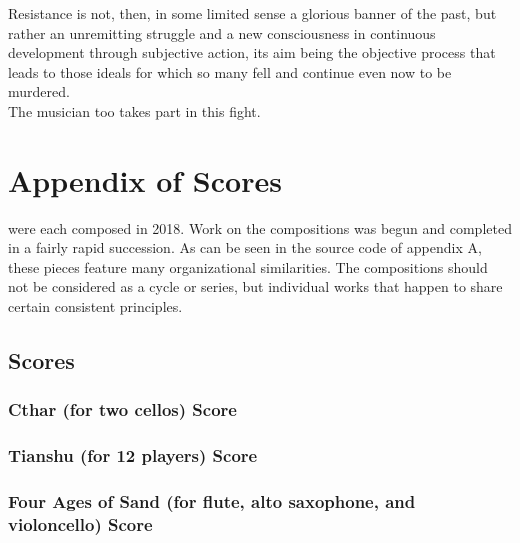 \singlespace
\begin{savequote}[75mm] 
Resistance is not, then, in some limited sense a glorious banner of the past, but rather an unremitting struggle and a new consciousness in continuous development through subjective action, its aim being the objective process that leads to those ideals for which so many fell and continue even now to be murdered. \\
The musician too takes part in this fight. \\
\citeyearpar[Music and Revolution pp.273--274]{Nono}
\end{savequote}

\chapter{Appendix of Scores}
\doublespace
{} were each composed in 2018. Work on the compositions was begun and completed in a fairly rapid succession. As can be seen in the source code of appendix A, these pieces feature many organizational similarities. The compositions should not be considered as a cycle or series, but individual works that happen to share certain consistent principles.
\singlespace


\section{Scores}
\subsection{Cthar (for two cellos) Score}


\subsection{Tianshu (for 12 players) Score}


\subsection{Four Ages of Sand (for flute, alto saxophone, and violoncello) Score}
